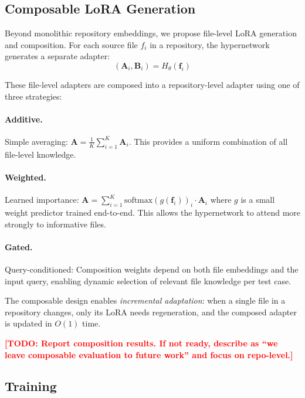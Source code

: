 \documentclass[11pt]{article}
\newcommand{\todo}[1]{\textcolor{red}{\textbf{[TODO: #1]}}}
\begin{document}
\subsection{Composable LoRA Generation}
\label{sec:composable}

Beyond monolithic repository embeddings, we propose file-level LoRA generation and composition.
For each source file $f_i$ in a repository, the hypernetwork generates a separate adapter:
\begin{equation}
    (\mathbf{A}_i, \mathbf{B}_i) = H_\theta(\mathbf{f}_i)
\end{equation}

These file-level adapters are composed into a repository-level adapter using one of three strategies:

\paragraph{Additive.} Simple averaging: $\mathbf{A} = \frac{1}{K}\sum_{i=1}^K \mathbf{A}_i$.
This provides a uniform combination of all file-level knowledge.

\paragraph{Weighted.} Learned importance: $\mathbf{A} = \sum_{i=1}^K \text{softmax}(g(\mathbf{f}_i))_i \cdot \mathbf{A}_i$ where $g$ is a small weight predictor trained end-to-end.
This allows the hypernetwork to attend more strongly to informative files.

\paragraph{Gated.} Query-conditioned: Composition weights depend on both file embeddings and the input query, enabling dynamic selection of relevant file knowledge per test case.

The composable design enables \emph{incremental adaptation}: when a single file in a repository changes, only its LoRA needs regeneration, and the composed adapter is updated in $O(1)$ time.

\todo{Report composition results. If not ready, describe as ``we leave composable evaluation to future work'' and focus on repo-level.}

\subsection{Training}
\label{sec:training}
\end{document}
